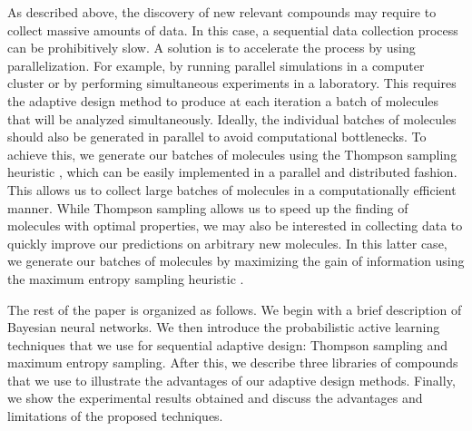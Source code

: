 As described above, the discovery of new relevant compounds may require to collect massive amounts of data. In this case,
a sequential data collection process can be prohibitively slow. A solution is to accelerate the process by using parallelization.
For example, by running parallel simulations in a computer cluster or by performing simultaneous experiments in a laboratory.
This requires the adaptive design method to produce at each iteration a batch of molecules that will be
analyzed simultaneously. Ideally, the individual batches of molecules should also be generated in parallel to avoid computational bottlenecks. To achieve this, we generate our batches of molecules using the Thompson sampling heuristic \cite{Thompson_1933},
which can be easily implemented in a parallel and distributed fashion. This allows us to collect large
batches of molecules in a computationally efficient manner. While Thompson sampling allows us to speed up
the finding of molecules with optimal properties, we may also be interested in collecting data to quickly
improve our predictions on arbitrary new molecules. In this latter case, we generate our batches
of molecules by maximizing the gain of information using the maximum entropy sampling heuristic \cite{MacKay_1992}.

The rest of the paper is organized as follows. We begin with a brief description of Bayesian neural networks. We then introduce the probabilistic active learning techniques that we use for sequential adaptive design: Thompson sampling and maximum entropy sampling. After this, we describe three libraries of compounds that we use to illustrate the advantages of our adaptive design methods. Finally, we show the experimental results obtained and discuss the advantages and limitations of the proposed techniques.
